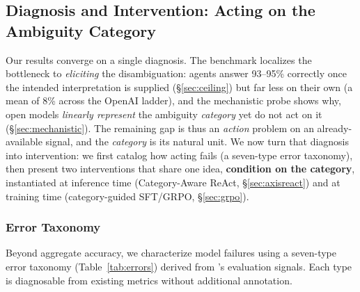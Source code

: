 \subsection{Diagnosis and Intervention: Acting on the Ambiguity Category}
\label{sec:error}

Our results converge on a single diagnosis. The benchmark localizes the
bottleneck to \emph{eliciting} the disambiguation: agents answer 93--95\%
correctly once the intended interpretation is supplied
(\S\ref{sec:ceiling}) but far less on their own (a mean of 8\% across the OpenAI
ladder), and the
mechanistic probe shows why, open models \emph{linearly represent} the ambiguity
\emph{category} yet do not act on it (\S\ref{sec:mechanistic}). The remaining gap is
thus an \emph{action} problem on an already-available signal, and the
\emph{category} is its natural unit. We now turn that diagnosis into
intervention: we first catalog how acting fails (a seven-type error taxonomy),
then present two interventions that share one idea, \textbf{condition on the
category}, instantiated at inference time (Category-Aware ReAct, \S\ref{sec:axisreact})
and at training time (category-guided SFT/GRPO, \S\ref{sec:grpo}).

\subsubsection{Error Taxonomy}

Beyond aggregate accuracy, we characterize model failures using a
seven-type error taxonomy (Table~\ref{tab:errors}) derived from
\fininteract's evaluation signals.
Each type is diagnosable from existing metrics without additional annotation.

